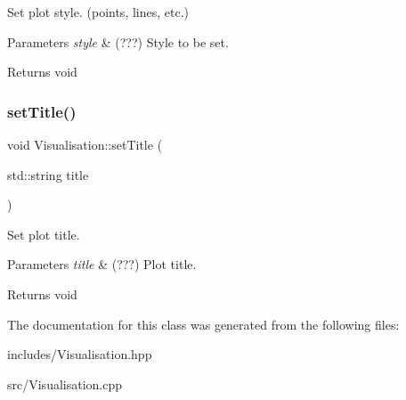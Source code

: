 Set plot style. (points, lines, etc.) 


\begin{DoxyParams}{Parameters}
{\em style} & (???) Style to be set. \\
\hline
\end{DoxyParams}
\begin{DoxyReturn}{Returns}
void 
\end{DoxyReturn}
\mbox{\label{class_visualisation_ac217fcae4984edeb003bfcd208a253de}} 
\subsubsection{\texorpdfstring{set\+Title()}{setTitle()}}
{\footnotesize\ttfamily void Visualisation\+::set\+Title (\begin{DoxyParamCaption}\item[{std\+::string}]{title }\end{DoxyParamCaption})}



Set plot title. 


\begin{DoxyParams}{Parameters}
{\em title} & (???) Plot title. \\
\hline
\end{DoxyParams}
\begin{DoxyReturn}{Returns}
void 
\end{DoxyReturn}


The documentation for this class was generated from the following files\+:\begin{DoxyCompactItemize}
\item 
includes/Visualisation.\+hpp\item 
src/Visualisation.\+cpp\end{DoxyCompactItemize}
